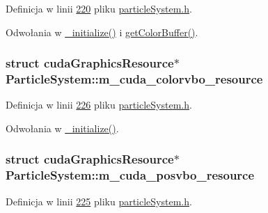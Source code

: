 Definicja w linii \hyperlink{particle_system_8h_source_l00220}{220} pliku \hyperlink{particle_system_8h_source}{particle\-System.\-h}.



Odwołania w \hyperlink{particle_system_8cpp_source_l00142}{\-\_\-initialize()} i \hyperlink{particle_system_8h_source_l00061}{get\-Color\-Buffer()}.

\hypertarget{class_particle_system_a140043869727535abc08609b835b98fc}{
\subsubsection[{m\-\_\-cuda\-\_\-colorvbo\-\_\-resource}]{\setlength{\rightskip}{0pt plus 5cm}struct cuda\-Graphics\-Resource$\ast$ Particle\-System\-::m\-\_\-cuda\-\_\-colorvbo\-\_\-resource\hspace{0.3cm}{\ttfamily [protected]}}}\label{class_particle_system_a140043869727535abc08609b835b98fc}


Definicja w linii \hyperlink{particle_system_8h_source_l00226}{226} pliku \hyperlink{particle_system_8h_source}{particle\-System.\-h}.



Odwołania w \hyperlink{particle_system_8cpp_source_l00142}{\-\_\-initialize()}.

\hypertarget{class_particle_system_a9c5de70c1705672e5722ad30dee1b14b}{
\subsubsection[{m\-\_\-cuda\-\_\-posvbo\-\_\-resource}]{\setlength{\rightskip}{0pt plus 5cm}struct cuda\-Graphics\-Resource$\ast$ Particle\-System\-::m\-\_\-cuda\-\_\-posvbo\-\_\-resource\hspace{0.3cm}{\ttfamily [protected]}}}\label{class_particle_system_a9c5de70c1705672e5722ad30dee1b14b}


Definicja w linii \hyperlink{particle_system_8h_source_l00225}{225} pliku \hyperlink{particle_system_8h_source}{particle\-System.\-h}.



